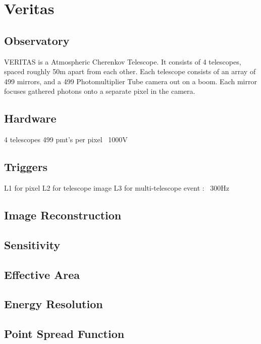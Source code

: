 \cleartooddpage[\thispagestyle{empty}]
\chapter{Veritas}

\section{Observatory}

VERITAS is a Atmospheric Cherenkov Telescope.
It consists of 4 telescopes, spaced roughly 50m apart from each other.
Each telescope consists of an array of 499 mirrors, and a 499 Photomultiplier Tube camera out on a boom.
Each mirror focuses gathered photons onto a separate pixel in the camera.


\section{Hardware}

4 telescopes
499 pmt's per pixel
~1000V

\section{Triggers}
L1 for pixel
L2 for telescope image
L3 for multi-telescope event : ~300Hz

\section{Image Reconstruction}

\section{Sensitivity}

\section{Effective Area}

\section{Energy Resolution}

\section{Point Spread Function}

